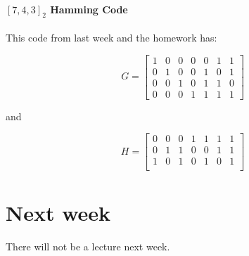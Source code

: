 \documentclass{idc_msc}
\begin{document}
\paragraph{\([7,4,3]_2\) Hamming Code}

This code from last week and the homework has:

\[
G =
\begin{bmatrix}
  1 & 0 & 0 & 0 & 0 & 1 & 1 \\
  0 & 1 & 0 & 0 & 1 & 0 & 1 \\
  0 & 0 & 1 & 0 & 1 & 1 & 0 \\
  0 & 0 & 0 & 1 & 1 & 1 & 1
\end{bmatrix}
\]

and

\[
H =
\begin{bmatrix}
  0 & 0 & 0 & 1 & 1 & 1 & 1 \\
  0 & 1 & 1 & 0 & 0 & 1 & 1 \\
  1 & 0 & 1 & 0 & 1 & 0 & 1 \\
\end{bmatrix}
\]

\section{Next week}

There will not be a lecture next week.
\end{document}
